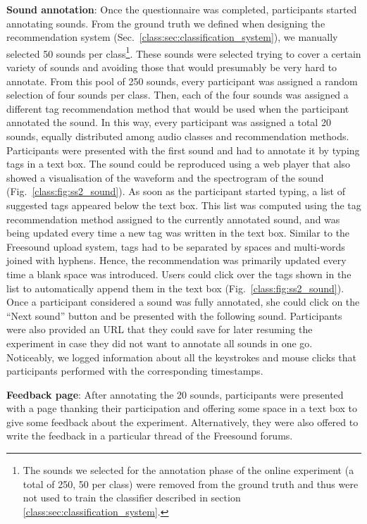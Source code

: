 \begin{description}
  \item \textbf{Sound annotation}: Once the questionnaire was completed, participants started annotating sounds. From the ground truth we defined when designing the recommendation system (Sec.~\ref{class:sec:classification_system}), we manually selected 50 sounds per class\footnote{The sounds we selected for the annotation phase of the online experiment (a total of 250, 50 per class) were removed from the ground truth and thus were not used to train the classifier described in section \ref{class:sec:classification_system}.}. These sounds were selected trying to cover a certain variety of sounds and avoiding those that would presumably be very hard to annotate. From this pool of 250 sounds, every participant was assigned a random selection of four sounds per class. Then, each of the four sounds was assigned a different tag recommendation method that would be used when the participant annotated the sound. In this way, every participant was assigned a total 20 sounds, equally distributed among audio classes and recommendation methods. Participants were presented with the first sound and had to annotate it by typing tags in a text box. The sound could be reproduced using a web player that also showed a visualisation of the waveform and the spectrogram of the sound (Fig.~\ref{class:fig:ss2_sound}). As soon as the participant started typing, a list of suggested tags appeared below the text box. This list was computed using the tag recommendation method assigned to the currently annotated sound, and was being updated every time a new tag was written in the text box. Similar to the Freesound upload system, tags had to be separated by spaces and multi-words joined with hyphens. Hence, the recommendation was primarily updated every time a blank space was introduced. Users could click over the tags shown in the list to automatically append them in the text box (Fig.~\ref{class:fig:ss2_sound}). Once a participant considered a sound was fully annotated, she could click on the ``Next sound'' button and be presented with the following sound. Participants were also provided an URL that they could save for later resuming the experiment in case they did not want to annotate all sounds in one go. Noticeably, we logged information about all the keystrokes and mouse clicks that participants performed with the corresponding timestamps.

  \item \textbf{Feedback page}: After annotating the 20 sounds, participants were presented with a page thanking their participation and offering some space in a text box to give some feedback about the experiment. Alternatively, they were also offered to write the feedback in a particular thread of the Freesound forums.

\end{description}

